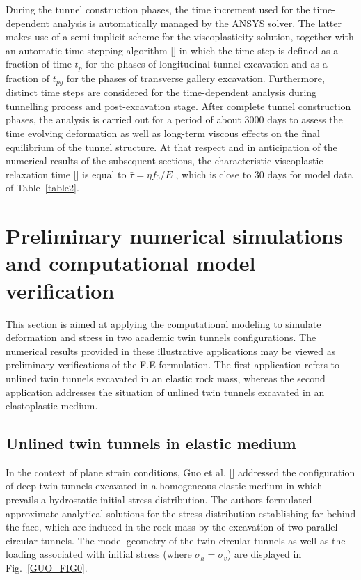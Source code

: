 \documentclass[a4paper,fleqn]{cas-sc}
\begin{document}
\FloatBarrier
During the tunnel construction phases, the time increment used for the time-dependent analysis is automatically managed by the ANSYS solver. The latter makes use of a semi-implicit scheme for the viscoplasticity solution, together with an automatic time stepping algorithm [] in which the time step is defined as a fraction of time $t_p$ for the phases of longitudinal tunnel excavation and as a fraction of $t_{pg}$ for the phases of transverse gallery excavation. Furthermore, distinct time steps are considered for the time-dependent analysis during tunnelling process and post-excavation stage. After complete tunnel construction phases, the analysis is carried out for a period of about $3000$ days to assess the time evolving deformation as well as long-term viscous effects on the final equilibrium of the tunnel structure. At that respect and in anticipation of the numerical results of the subsequent sections, the characteristic viscoplastic relaxation time [] is equal to $\bar{\tau} = \eta f_0 / E$ , which is close to $30$ days for model data of Table~\ref{table2}.

\section{Preliminary numerical simulations and computational model verification}\label{}

This section is aimed at applying the computational modeling to simulate deformation and stress in two academic twin tunnels configurations. The numerical results provided in these illustrative applications may be viewed as preliminary verifications of the F.E formulation. The first application refers to unlined twin tunnels excavated in an elastic rock mass, whereas the second application addresses the situation of unlined twin tunnels excavated in an elastoplastic medium.

\subsection{Unlined twin tunnels in elastic medium}

In the context of plane strain conditions, Guo et al. [] addressed the configuration of deep twin tunnels excavated in a homogeneous elastic medium in which prevails a hydrostatic initial stress distribution. The authors formulated approximate analytical solutions for the stress distribution establishing far behind the face, which are induced in the rock mass by the excavation of two parallel circular tunnels. The model geometry of the twin circular tunnels as well as the loading associated with initial stress (where $\sigma_h = \sigma_v$) are displayed in Fig.~\ref{GUO_FIG0}.
\end{document}
